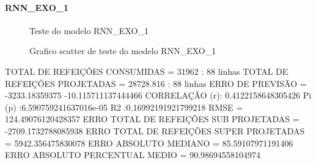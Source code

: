 \documentclass[	12pt, Times, openright, twoside, a4paper, english, brazil]{abntex2}
\begin{document}
              \paragraph{RNN\_EXO\_1}
                \begin{figure}[!ht]
                  \caption{Teste do modelo RNN\_EXO\_1 \label{fig:case1_rnn_exo_1_test} }
                \end{figure}

                \begin{figure}[!ht]
                  \caption{Grafico scatter de teste do modelo RNN\_EXO\_1 \label{fig:case1_rnn_exo_1_test_scatter} }
                \end{figure}
                \hline TOTAL DE REFEIÇÕES CONSUMIDAS = 31962 : 88 linhas
                \hline TOTAL DE REFEIÇÕES PROJETADAS = 28728.816 : 88 linhas
                \hline ERRO DE PREVISÃO = -3233.18359375 -10.115711137444466 %
                \hline CORRELAÇÃO (r): 0.4122158648305426 Pi (p) :6.590759241637016e-05 R2 :0.16992191921799218
                \hline RMSE = 124.49076120428357
                \hline ERRO TOTAL DE REFEIÇÕES SUB PROJETADAS = -2709.1732788085938
                \hline ERRO TOTAL DE REFEIÇÕES SUPER PROJETADAS = 5942.356475830078
                \hline ERRO ABSOLUTO MEDIANO = 85.59107971191406
                \hline ERRO ABSOLUTO PERCENTUAL MEDIO = 90.98694558104974%
\end{document}
